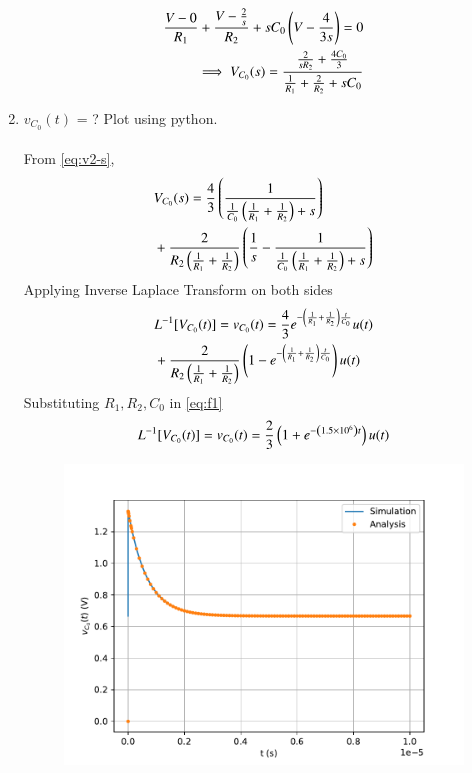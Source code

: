 \documentclass[journal,12pt,twocolumn]{IEEEtran}
\renewcommand\thesection{\arabic{section}}
\begin{document}
\begin{enumerate}[label=\arabic*.,ref=\thesection.\theenumi]
\begin{align}
\frac{V - 0}{R_1} + \frac{V - \frac{2}{s}}{R_2} + sC_0\left(V - \frac{4}{3s}\right) = 0 \\
\implies V_{C_0}(s) = \frac{\frac{2}{sR_2} + \frac{4C_0}{3}}{\frac{1}{R_1} + \frac{2}{R_2} + sC_0}
\label{eq:v2-s}
\end{align}
\item $v_{C_0}(t)$ = ? Plot using python.
\\
\solution
\\
From \eqref{eq:v2-s},
\begin{align}
&V_{C_0}(s) = \frac{4}{3}\left(\frac{1}{\frac{1}{C_0}\left(\frac{1}{R_1} + \frac{1}{R_2}\right)+s}\right) \nonumber \\
&+ \frac{2}{R_2\left(\frac{1}{R_1} +\frac{1}{R_2}\right)}\left(\frac{1}{s} - \frac{1}{\frac{1}{C_0}\left(\frac{1}{R_1} + \frac{1}{R_2}\right) + s}\right)
\end{align}
Applying Inverse Laplace Transform on both sides
\begin{align}
&L^{-1}[V_{C_0}(t)]=v_{C_0}(t) = \frac{4}{3}e^{-\left(\frac{1}{R_1} + \frac{1}{R_2}\right)\frac{t}{C_0}}u(t) \nonumber \\
&+ \frac{2}{R_2\left(\frac{1}{R_1}+\frac{1}{R_2}\right)}\left(1 - e^{-\left(\frac{1}{R_1} + \frac{1}{R_2}\right)\frac{t}{C_0}}\right)u(t) \label{eq:f1}
\end{align}
Substituting $R_1, R_2, C_0$ in \eqref{eq:f1}
\begin{align}
L^{-1}[V_{C_0}(t)] =v_{C_0}(t)= \frac{2}{3}\left(1 +e^{-\left(1.5 \times 10^6\right)t}\right)u(t)
\label{eq:v2-t}
\end{align}
\begin{figure}[!htb]
\includegraphics[width=\columnwidth]{figs/3_4.pdf}

\end{figure}
\end{enumerate}
\end{document}
